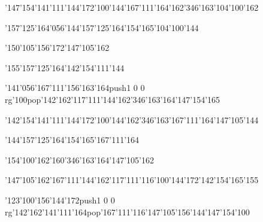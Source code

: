 \null\vfill\ipa\centerline{\enskip\char'147\char'154\char'141\char'111\char'144\char'172\enskip\char'100\char'144\enskip\char'167\char'111\char'164\enskip\enskip\enskip\enskip\enskip\enskip\char'162\char'346\char'163\enskip\char'104\char'100\char'162}\medskip\centerline{\enskip\char'157\char'125\char'164\char'056\char'144\char'157\char'125\char'164\enskip\char'154\char'165\enskip\char'104\char'100\char'144\enskip\enskip\enskip\enskip\enskip\enskip\enskip\enskip\enskip}\medskip\centerline{\enskip\enskip\enskip\enskip\enskip\enskip\enskip\enskip\char'150\char'105\char'156\char'172\enskip\enskip\enskip\char'147\char'105\char'162}\medskip\centerline{\enskip\enskip\enskip\enskip\enskip\enskip\enskip\enskip\enskip\enskip\enskip\enskip\char'155\char'157\char'125\char'164\enskip\enskip\enskip\enskip\enskip\char'142\char'154\char'111\char'144}\medskip\centerline{\enskip\char'141\char'056\char'167\char'111\char'156\char'163\char'164\enskip\pdfcolorstack\match push{1 0 0 rg}\char'100\pdfcolorstack\match pop{}\enskip\char'142\char'162\char'117\char'111\char'144\enskip\enskip\enskip\enskip\enskip\enskip\char'162\char'346\char'163\char'164\enskip\char'147\char'154\char'165}\medskip\vfill\footline{\hfil\tt\folio\hfil}\eject
\null\vfill\ipa\centerline{\enskip\char'142\char'154\char'141\char'111\char'144\char'172\enskip\char'100\char'144\enskip\char'162\char'346\char'163\enskip\enskip\enskip\enskip\enskip\enskip\char'167\char'111\char'164\enskip\char'147\char'105\char'144}\medskip\centerline{\enskip\enskip\enskip\enskip\char'144\char'157\char'125\char'164\enskip\char'154\char'165\enskip\char'167\char'111\char'164\enskip\enskip\enskip\enskip\enskip\enskip\enskip\enskip\enskip}\medskip\centerline{\enskip\char'154\char'100\char'162\enskip\enskip\enskip\enskip\char'160\char'346\char'163\char'164\enskip\enskip\enskip\char'147\char'105\char'162}\medskip\centerline{\enskip\enskip\enskip\enskip\char'147\char'105\char'162\enskip\char'167\char'111\char'144\enskip\char'162\char'117\char'111\char'116\enskip\char'100\char'144\char'172\enskip\char'142\char'154\char'165\char'155}\medskip\centerline{\enskip\enskip\char'123\char'100\char'156\char'144\char'172\enskip\enskip\enskip\pdfcolorstack\match push{1 0 0 rg}\char'142\char'162\char'141\char'111\char'164\pdfcolorstack\match pop{}\enskip\char'167\char'111\char'116\enskip\enskip\enskip\char'147\char'105\char'156\char'144\enskip\char'147\char'154\char'100}\medskip\vfill\footline{\hfil\tt\folio\hfil}\eject
